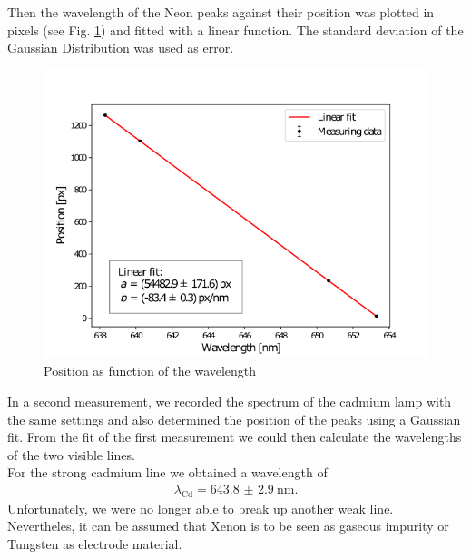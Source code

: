 Then the wavelength of the Neon peaks against their position was plotted in pixels (see Fig. \ref{fig:position}) and fitted with a linear function.
The standard deviation of the Gaussian Distribution was used as error.
\begin{figure}[ht]
\centering
\includegraphics[scale=.55]{images//position.png}
\caption{Position as function of the wavelength}
\label{fig:position}
\end{figure}
In a second measurement, we recorded the spectrum of the cadmium lamp with the same settings and also determined the position of the peaks using a Gaussian fit.
From the fit of the first measurement we could then calculate the wavelengths of the two visible lines.\\
For the strong cadmium line we obtained a wavelength of
\begin{align*}
\lambda_\text{Cd}=\SI{643.8(29)}{\nano\meter}.
\end{align*}
Unfortunately, we were no longer able to break up another weak line.
Nevertheles, it can be assumed that Xenon is to be seen as gaseous impurity or Tungsten as electrode material.